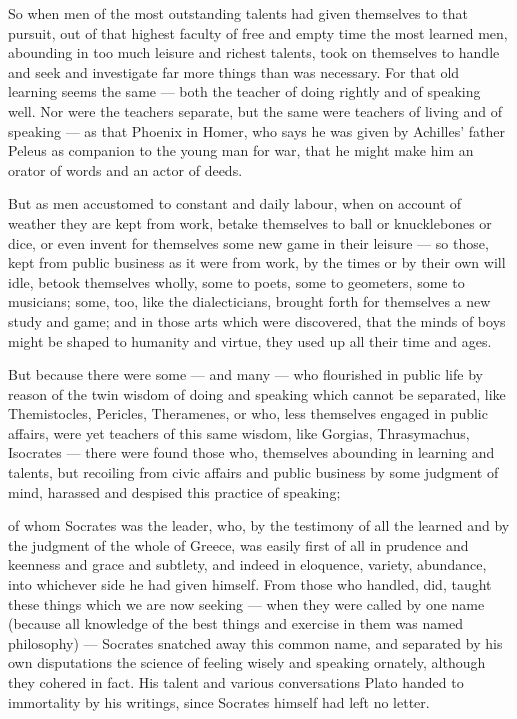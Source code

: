  So when men of the most outstanding talents had given themselves to that pursuit, out of that highest faculty of free and empty time the most learned men, abounding in too much leisure and richest talents, took on themselves to handle and seek and investigate far more things than was necessary. For that old learning seems the same — both the teacher of doing rightly and of speaking well. Nor were the teachers separate, but the same were teachers of living and of speaking — as that Phoenix in Homer, who says he was given by Achilles' father Peleus as companion to the young man for war, that he might make him an orator of words and an actor of deeds.

 But as men accustomed to constant and daily labour, when on account of weather they are kept from work, betake themselves to ball or knucklebones or dice, or even invent for themselves some new game in their leisure — so those, kept from public business as it were from work, by the times or by their own will idle, betook themselves wholly, some to poets, some to geometers, some to musicians; some, too, like the dialecticians, brought forth for themselves a new study and game; and in those arts which were discovered, that the minds of boys might be shaped to humanity and virtue, they used up all their time and ages.

 But because there were some — and many — who flourished in public life by reason of the twin wisdom of doing and speaking which cannot be separated, like Themistocles, Pericles, Theramenes, or who, less themselves engaged in public affairs, were yet teachers of this same wisdom, like Gorgias, Thrasymachus, Isocrates — there were found those who, themselves abounding in learning and talents, but recoiling from civic affairs and public business by some judgment of mind, harassed and despised this practice of speaking;

 of whom Socrates was the leader, who, by the testimony of all the learned and by the judgment of the whole of Greece, was easily first of all in prudence and keenness and grace and subtlety, and indeed in eloquence, variety, abundance, into whichever side he had given himself. From those who handled, did, taught these things which we are now seeking — when they were called by one name (because all knowledge of the best things and exercise in them was named philosophy) — Socrates snatched away this common name, and separated by his own disputations the science of feeling wisely and speaking ornately, although they cohered in fact. His talent and various conversations Plato handed to immortality by his writings, since Socrates himself had left no letter.

